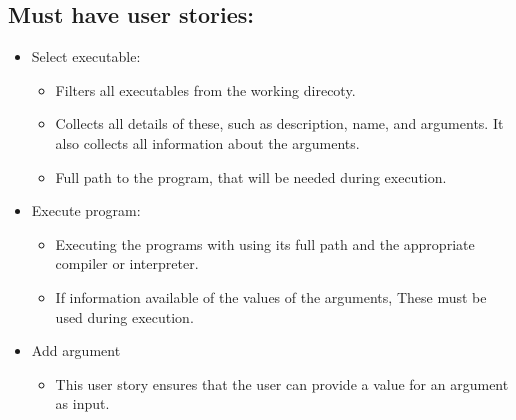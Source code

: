 \documentclass{article}
\begin{document}
\subsection{Must have user stories:}
\begin{itemize}
    \item Select executable:
    \begin{itemize}
        \item Filters all executables from the working direcoty.
        \item Collects all details of these, such as description, name, and arguments. It also collects all information about the arguments.
        \item Full path to the program, that will be needed during execution.
    \end{itemize}
    \item Execute program:
    \begin{itemize}
        \item Executing the programs with using its full path and the appropriate compiler or interpreter.
        \item If information available of the values of the arguments, These must be used during execution.
    \end{itemize}
    \item Add argument
    \begin{itemize}
        \item This user story ensures that the user can provide a value for an argument as input.
    \end{itemize}
\end{itemize}
\end{document}
